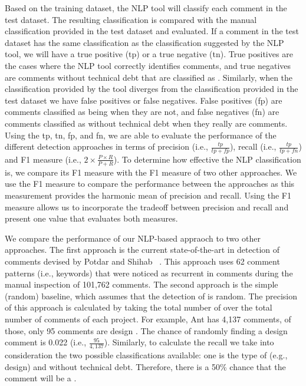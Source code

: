 Based on the training dataset, the NLP tool will classify each comment in the test dataset. The resulting classification is compared with the manual classification provided in the test dataset and evaluated. If a comment in the test dataset has the same classification as the classification suggested by the NLP tool, we will have a true positive (tp) or a true negative (tn). True positives are the cases where the NLP tool correctly identifies \SATD comments, and true negatives are comments without technical debt that are classified as \SATD. Similarly, when the classification provided by the tool diverges from the classification provided in the test dataset we have false positives or false negatives. False positives (fp) are comments classified as being \SATD when they are not, and false negatives (fn) are comments classified as without technical debt when they really are \SATD comments. Using the tp, tn, fp, and fn, we are able to evaluate the performance of the different detection approaches in terms of precision (i.e., $\frac{tp}{tp + fp}$), recall (i.e., $\frac{tp}{tp + fn}$) and F1 measure (i.e., $2 \times \frac{P \times R}{P + R}$). To determine how effective the NLP classification is, we compare its F1 measure with the F1 measure of two other approaches. We use the F1 measure to compare the performance between the approaches as this measurement provides the harmonic mean of precision and recall. Using the F1 measure allows us to incorporate the tradeoff between precision and recall and present one value that evaluates both measures.


We compare the performance of our NLP-based appraoch to two other approaches. The first approach is the current state-of-the-art in detection of \SATD comments devised by Potdar and Shihab ~\cite{Potdar2014ICSME}. This approach uses 62 comment patterns (i.e., keywords) that were noticed as recurrent in \SATD comments during the manual inspection of 101,762 comments. The second approach is the simple (random) baseline, which assumes that the detection of \SATD is random. The precision of this approach is calculated by taking the total number of \SATD over the total number of comments of each project. For example, Ant has 4,137 comments, of those, only 95 comments are design \SATD. The chance of randomly finding a design \SATD comment is 0.022 (i.e., $\frac{95}{4,137}$). Similarly, to calculate the recall we take into consideration the two possible classifications available: one is the type of \SATD (e.g., design) and without technical debt. Therefore, there is a 50\% chance that the comment will be a \SATD. 

